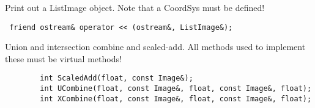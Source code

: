            Print out a ListImage object. Note that a CoordSys must be defined!
\begin{verbatim}
 friend ostream& operator << (ostream&, ListImage&);
\end{verbatim}

           Union and intersection combine and scaled-add.
           All methods used to implement these must be virtual methods!
\begin{verbatim}
        int ScaledAdd(float, const Image&);
        int UCombine(float, const Image&, float, const Image&, float);
        int XCombine(float, const Image&, float, const Image&, float);
\end{verbatim}

